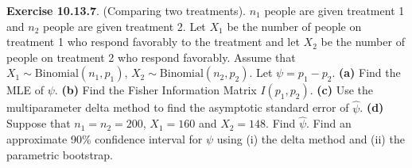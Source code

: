 \textbf{Exercise 10.13.7}. (Comparing two treatments). \(n_{1}\) people
are given treatment 1 and \(n_{2}\) people are given treatment 2. Let
\(X_{1}\) be the number of people on treatment 1 who respond favorably to
the treatment and let \(X_{2}\) be the number of people on treatment 2 who
respond favorably. Assume that \(X_{1} \sim \text{Binomial}(n_{1}, p_{1})\),
\(X_{2} \sim \text{Binomial}(n_{2}, p_{2})\). Let \(\psi = p_{1} - p_{2}\).
\textbf{(a)} Find the MLE of \(\psi\).
\textbf{(b)} Find the Fisher Information Matrix \(I(p_{1}, p_{2})\).
\textbf{(c)} Use the multiparameter delta method to find the asymptotic
standard error of \(\hat{\psi}\).
\textbf{(d)} Suppose that \(n_{1} = n_{2} = 200\), \(X_{1} = 160\) and
\(X_{2} = 148\). Find \(\hat{\psi}\). Find an approximate 90\% confidence
interval for \(\psi\) using (i) the delta method and (ii) the parametric
bootstrap.

